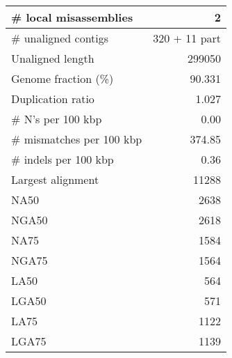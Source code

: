 \documentclass[12pt,a4paper]{article}
\begin{document}
\begin{table}[ht]
\begin{center}
\begin{tabular}{|l*{1}{|r}|}
\# local misassemblies & 2 \\ \hline
\# unaligned contigs & 320 + 11 part \\ \hline
Unaligned length & 299050 \\ \hline
Genome fraction (\%) & 90.331 \\ \hline
Duplication ratio & 1.027 \\ \hline
\# N's per 100 kbp & 0.00 \\ \hline
\# mismatches per 100 kbp & 374.85 \\ \hline
\# indels per 100 kbp & 0.36 \\ \hline
Largest alignment & 11288 \\ \hline
NA50 & 2638 \\ \hline
NGA50 & 2618 \\ \hline
NA75 & 1584 \\ \hline
NGA75 & 1564 \\ \hline
LA50 & 564 \\ \hline
LGA50 & 571 \\ \hline
LA75 & 1122 \\ \hline
LGA75 & 1139 \\ \hline
\end{tabular}
\end{center}
\end{table}
\end{document}
